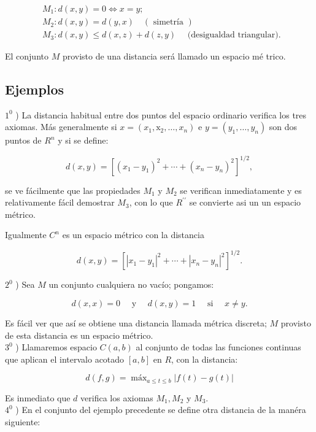 \documentclass[10pt]{article}
\theoremstyle{plain}
\theoremstyle{definition}
\theoremstyle{remark}
\begin{document}
$$
\begin{aligned}
& M_{1}: d(x, y)=0 \Leftrightarrow x=y ; \\
& M_{2}: d(x, y)=d(y, x) \quad(\text { simetría }) \\
& M_{3}: d(x, y) \leqslant d(x, z)+d(z, y) \quad \text { (desigualdad triangular). }
\end{aligned}
$$

El conjunto $M$ provisto de una distancia será llamado un espacio mé trico.

\subsection{Ejemplos}
$1^{0}$ ) La distancia habitual entre dos puntos del espacio ordinario verifica los tres axiomas. Más generalmente si $x=\left(x_{1}, \mathrm{x}_{2}, \ldots, x_{n}\right)$ e $y=\left(y_{1}, \ldots, y_{n}\right)$ son dos puntos de $R^{n}$ y si se define:


\begin{equation*}
d(x, y)=\left[\left(x_{1}-y_{1}\right)^{2}+\cdots+\left(x_{n}-y_{n}\right)^{2}\right]^{1 / 2}, \tag{1-1}
\end{equation*}


se ve fácilmente que las propiedades $M_{1}$ y $M_{2}$ se verifican inmediatamente y es relativamente fácil demostrar $M_{3}$, con lo que $R^{\prime \prime}$ se convierte asi un un espacio métrico.

Igualmente $C^{n}$ es un espacio métrico con la distancia

$$
d(x, y)=\left[\left|x_{1}-y_{1}\right|^{2}+\cdots+\left|x_{n}-y_{n}\right|^{2}\right]^{1 / 2} .
$$

$2^{0}$ ) Sea $M$ un conjunto cualquiera no vacío; pongamos:

$$
d(x, x)=0 \quad \text { y } \quad d(x, y)=1 \quad \text { si } \quad x \neq y .
$$

Es fácil ver que así se obtiene una distancia llamada métrica discreta; $M$ provisto de esta distancia es un espacio métrico.\\
$3^{0}$ ) Llamaremos espacio $C(a, b)$ al conjunto de todas las funciones continuas que aplican el intervalo acotado $[a, b]$ en $R$, con la distancia:


\begin{equation*}
d(f, g)=\operatorname{máx}_{a \leqslant t \leqslant b}|f(t)-g(t)| \tag{$1\cdot2$}
\end{equation*}


Es inmediato que $d$ verifica los axiomas $M_{1}, M_{2}$ y $M_{3}$.\\
$4^{0}$ ) En el conjunto del ejemplo precedente se define otra distancia de la manéra siguiente:
\end{document}
